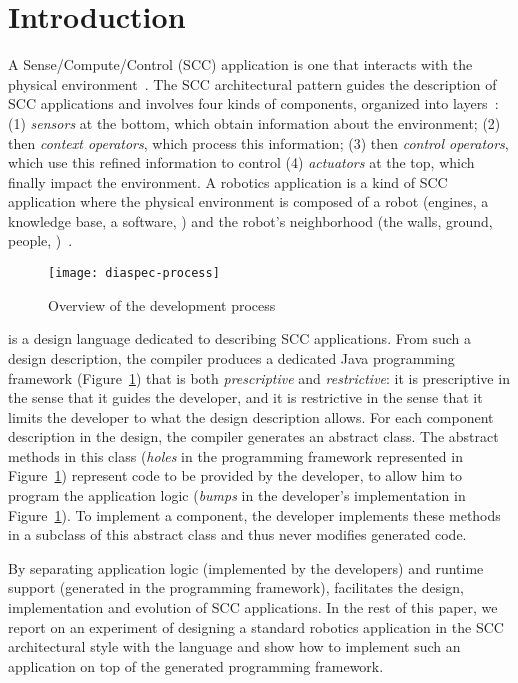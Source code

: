 \section{Introduction}

A Sense/Compute/Control (SCC) application is one that interacts with
the physical environment~\cite{Tayl09a}. The SCC architectural pattern
guides the description of SCC applications and involves four kinds of
components, organized into layers~\cite{Cass11a,Edwar09a}: (1)
\emph{sensors} at the bottom, which obtain information about the
environment; (2) then \emph{context operators}, which process this
information; (3) then \emph{control operators}, which use this refined
information to control (4) \emph{actuators} at the top, which finally
impact the environment. A robotics application is a kind of SCC
application where the physical environment is composed of a robot
(engines, a knowledge base, a software, \etc{}) and the robot's
neighborhood (the walls, ground, people, \etc{})~\cite{Sicil08a}.

\begin{figure}
  \centering
  \texttt{[image: diaspec-process]}
  \caption{Overview of the \diaspec{} development process}
  \label{fig:diaspec-process}
\end{figure}

\diaspec{} is a design language dedicated to describing SCC
applications. From such a design description, the \diaspec{} compiler
produces a dedicated Java programming framework
(Figure~\ref{fig:diaspec-process}) that is both \emph{prescriptive}
and \emph{restrictive}: it is prescriptive in the sense that it guides
the developer, and it is restrictive in the sense that it limits the
developer to what the design description allows. For each component
description in the design, the compiler generates an abstract class.
The abstract methods in this class (\emph{holes} in the programming
framework represented in Figure~\ref{fig:diaspec-process}) represent
code to be provided by the developer, to allow him to program the
application logic (\textit{bumps} in the developer's implementation in
Figure~\ref{fig:diaspec-process}). To implement a component, the
developer implements these methods in a subclass of this abstract
class and thus never modifies generated code.

By separating application logic (implemented by the developers) and
runtime support (generated in the programming framework), \diaspec{}
facilitates the design, implementation and evolution of SCC
applications. In the rest of this paper, we report on an experiment of
designing a standard robotics application in the SCC architectural
style with the \diaspec{} language and show how to implement such an
application on top of the generated programming framework.

